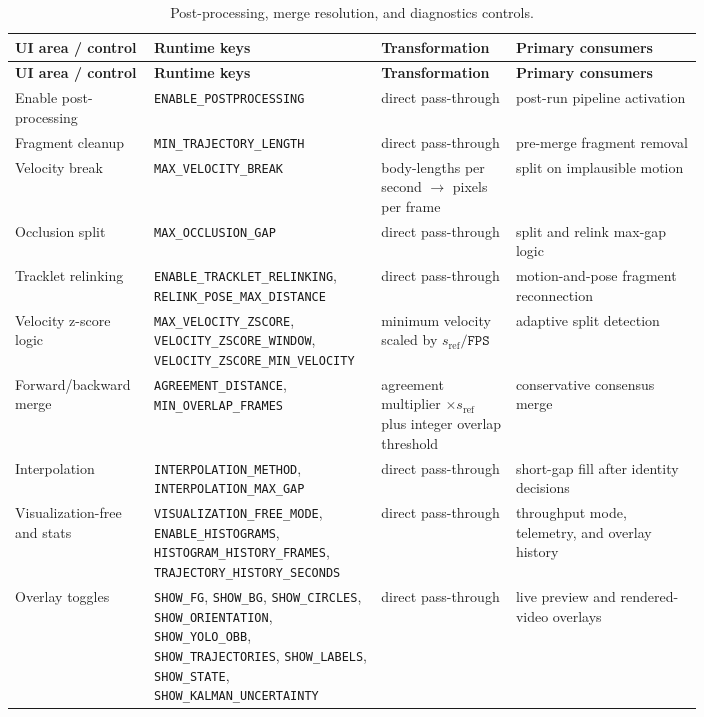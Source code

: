 \documentclass[11pt]{article}
\newcommand{\runtimekey}[1]{\texttt{#1}}
\begin{document}
\begin{longtable}{L{0.16\linewidth} L{0.21\linewidth} L{0.18\linewidth} L{0.25\linewidth}}
\caption{Post-processing, merge resolution, and diagnostics controls.}\label{tab:ui-post}\\
\toprule
\textbf{UI area / control} & \textbf{Runtime keys} & \textbf{Transformation} & \textbf{Primary consumers} \\
\midrule
\endfirsthead
\toprule
\textbf{UI area / control} & \textbf{Runtime keys} & \textbf{Transformation} & \textbf{Primary consumers} \\
\midrule
\endhead
Enable post-processing & \runtimekey{ENABLE\_POSTPROCESSING} & direct pass-through & post-run pipeline activation \\
Fragment cleanup & \runtimekey{MIN\_TRAJECTORY\_LENGTH} & direct pass-through & pre-merge fragment removal \\
Velocity break & \runtimekey{MAX\_VELOCITY\_BREAK} & body-lengths per second $\rightarrow$ pixels per frame & split on implausible motion \\
Occlusion split & \runtimekey{MAX\_OCCLUSION\_GAP} & direct pass-through & split and relink max-gap logic \\
Tracklet relinking & \runtimekey{ENABLE\_TRACKLET\_RELINKING}, \runtimekey{RELINK\_POSE\_MAX\_DISTANCE} & direct pass-through & motion-and-pose fragment reconnection \\
Velocity z-score logic & \runtimekey{MAX\_VELOCITY\_ZSCORE}, \runtimekey{VELOCITY\_ZSCORE\_WINDOW}, \runtimekey{VELOCITY\_ZSCORE\_MIN\_VELOCITY} & minimum velocity scaled by $s_{\text{ref}}/\runtimekey{FPS}$ & adaptive split detection \\
Forward/backward merge & \runtimekey{AGREEMENT\_DISTANCE}, \runtimekey{MIN\_OVERLAP\_FRAMES} & agreement multiplier $\times s_{\text{ref}}$ plus integer overlap threshold & conservative consensus merge \\
Interpolation & \runtimekey{INTERPOLATION\_METHOD}, \runtimekey{INTERPOLATION\_MAX\_GAP} & direct pass-through & short-gap fill after identity decisions \\
Visualization-free and stats & \runtimekey{VISUALIZATION\_FREE\_MODE}, \runtimekey{ENABLE\_HISTOGRAMS}, \runtimekey{HISTOGRAM\_HISTORY\_FRAMES}, \runtimekey{TRAJECTORY\_HISTORY\_SECONDS} & direct pass-through & throughput mode, telemetry, and overlay history \\
Overlay toggles & \runtimekey{SHOW\_FG}, \runtimekey{SHOW\_BG}, \runtimekey{SHOW\_CIRCLES}, \runtimekey{SHOW\_ORIENTATION}, \runtimekey{SHOW\_YOLO\_OBB}, \runtimekey{SHOW\_TRAJECTORIES}, \runtimekey{SHOW\_LABELS}, \runtimekey{SHOW\_STATE}, \runtimekey{SHOW\_KALMAN\_UNCERTAINTY} & direct pass-through & live preview and rendered-video overlays \\
\bottomrule
\end{longtable}
\end{document}
